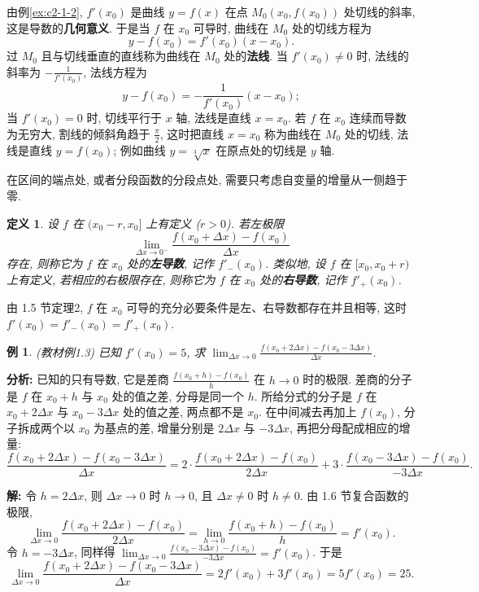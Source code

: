 \documentclass[UTF8,openany]{ctexbook}
\theoremstyle{chinesetextbook}
\newtheorem{definition}{定义}[section]
\newtheorem{example}{例}[section]
\newenvironment{cnsolution}{\par\indent\textbf{解:} \ignorespaces}{\par}
\begin{document}
由例\ref{ex:c2-1-2}, $f'(x_0)$ 是曲线 $y=f(x)$ 在点 $M_0(x_0,f(x_0))$ 处切线的斜率, 这是导数的\textbf{几何意义}. 于是当 $f$ 在 $x_0$ 可导时, 曲线在 $M_0$ 处的切线方程为
\[
y-f(x_0)=f'(x_0)(x-x_0).
\]
过 $M_0$ 且与切线垂直的直线称为曲线在 $M_0$ 处的\textbf{法线}. 当 $f'(x_0)\ne0$ 时, 法线的斜率为 $\displaystyle-\frac1{f'(x_0)}$, 法线方程为
\[
y-f(x_0)=-\frac1{f'(x_0)}(x-x_0);
\]
当 $f'(x_0)=0$ 时, 切线平行于 $x$ 轴, 法线是直线 $x=x_0$. 若 $f$ 在 $x_0$ 连续而导数为无穷大, 割线的倾斜角趋于 $\displaystyle\frac\pi2$, 这时把直线 $x=x_0$ 称为曲线在 $M_0$ 处的切线, 法线是直线 $y=f(x_0)$; 例如曲线 $y=\sqrt[3]x$ 在原点处的切线是 $y$ 轴.

在区间的端点处, 或者分段函数的分段点处, 需要只考虑自变量的增量从一侧趋于零.
\begin{definition}
设 $f$ 在 $(x_0-r,x_0]$ 上有定义 ($r>0$). 若左极限
\[
\lim_{\Delta x\to0^-}\frac{f(x_0+\Delta x)-f(x_0)}{\Delta x}
\]
存在, 则称它为 $f$ 在 $x_0$ 处的\textbf{左导数}, 记作 $f'_-(x_0)$. 类似地, 设 $f$ 在 $[x_0,x_0+r)$ 上有定义, 若相应的右极限存在, 则称它为 $f$ 在 $x_0$ 处的\textbf{右导数}, 记作 $f'_+(x_0)$.
\end{definition}
由 1.5 节定理2, $f$ 在 $x_0$ 可导的充分必要条件是左、右导数都存在并且相等, 这时 $f'(x_0)=f'_-(x_0)=f'_+(x_0)$.
\begin{example}\label{ex:c2-1-3}
\textnormal{(教材例1.3)} 已知 $f'(x_0)=5$, 求 $\displaystyle\lim_{\Delta x\to0}\frac{f(x_0+2\Delta x)-f(x_0-3\Delta x)}{\Delta x}$.
\end{example}
\par\indent\textbf{分析:} 已知的只有导数, 它是差商 $\displaystyle\frac{f(x_0+h)-f(x_0)}h$ 在 $h\to0$ 时的极限. 差商的分子是 $f$ 在 $x_0+h$ 与 $x_0$ 处的值之差, 分母是同一个 $h$. 所给分式的分子是 $f$ 在 $x_0+2\Delta x$ 与 $x_0-3\Delta x$ 处的值之差, 两点都不是 $x_0$. 在中间减去再加上 $f(x_0)$, 分子拆成两个以 $x_0$ 为基点的差, 增量分别是 $2\Delta x$ 与 $-3\Delta x$, 再把分母配成相应的增量:
\[
\frac{f(x_0+2\Delta x)-f(x_0-3\Delta x)}{\Delta x}=2\cdot\frac{f(x_0+2\Delta x)-f(x_0)}{2\Delta x}+3\cdot\frac{f(x_0-3\Delta x)-f(x_0)}{-3\Delta x}.
\]
\begin{cnsolution}
令 $h=2\Delta x$, 则 $\Delta x\to0$ 时 $h\to0$, 且 $\Delta x\ne0$ 时 $h\ne0$. 由 1.6 节复合函数的极限,
\[
\lim_{\Delta x\to0}\frac{f(x_0+2\Delta x)-f(x_0)}{2\Delta x}=\lim_{h\to0}\frac{f(x_0+h)-f(x_0)}h=f'(x_0).
\]
令 $h=-3\Delta x$, 同样得 $\displaystyle\lim_{\Delta x\to0}\frac{f(x_0-3\Delta x)-f(x_0)}{-3\Delta x}=f'(x_0)$. 于是
\[
\lim_{\Delta x\to0}\frac{f(x_0+2\Delta x)-f(x_0-3\Delta x)}{\Delta x}=2f'(x_0)+3f'(x_0)=5f'(x_0)=25.
\]
\end{cnsolution}
\end{document}
